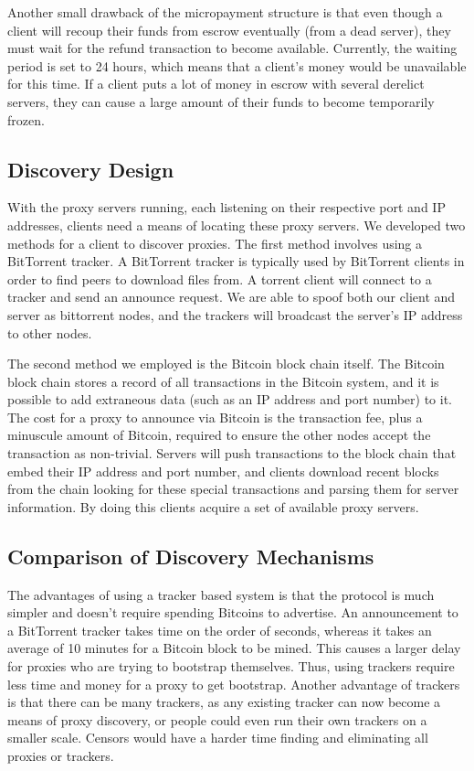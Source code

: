 Another small drawback of the micropayment structure is that even though a client will recoup their funds from escrow eventually (from a dead server), they must wait for the refund transaction to become available. Currently, the waiting period is set to 24 hours, which means that a client's money would be unavailable for this time. If a client puts a lot of money in escrow with several derelict servers, they can cause a large amount of their funds to become temporarily frozen.

\subsection{Discovery Design}
\label{sec:discovery}

With the proxy servers running, each listening on their respective port and IP addresses, clients need a means of locating these proxy servers. We developed two methods for a client to discover proxies. The first method involves using a BitTorrent tracker. A BitTorrent tracker is typically used by BitTorrent clients in order to find peers to download files from. A torrent client will connect to a tracker and send an announce request. We are able to spoof both our client and server as bittorrent nodes, and the trackers will broadcast the server's IP address to other nodes.

The second method we employed is the Bitcoin block chain itself. The Bitcoin block chain stores a record of all transactions in the Bitcoin system, and it is possible to add extraneous data (such as an IP address and port number) to it. The cost for a proxy to announce via Bitcoin is the transaction fee, plus a minuscule amount of Bitcoin, required to ensure the other nodes accept the transaction as non-trivial. Servers will push transactions to the block chain that embed their IP address and port number, and clients download recent blocks from the chain looking for these special transactions and parsing them for server information. By doing this clients acquire a set of available proxy servers.

\subsection{Comparison of Discovery Mechanisms}
The advantages of using a tracker based system is that the protocol is much simpler and doesn't require spending Bitcoins to advertise. An announcement to a BitTorrent tracker takes time on the order of seconds, whereas it takes an average of 10 minutes for a Bitcoin block to be mined. This causes a larger delay for proxies who are trying to bootstrap themselves. Thus, using trackers require less time and money for a proxy to get bootstrap. Another advantage of trackers is that there can be many trackers, as any existing tracker can now become a means of proxy discovery, or people could even run their own trackers on a smaller scale. Censors would have a harder time finding and eliminating all proxies or trackers.

